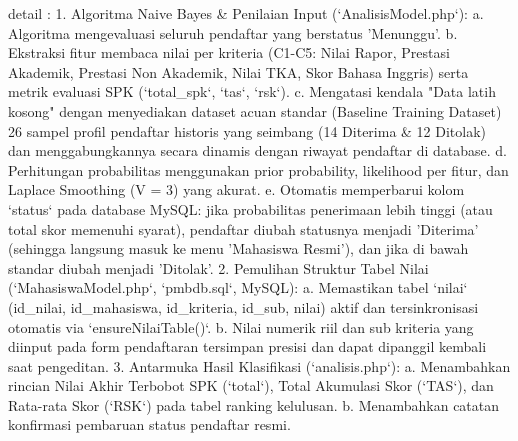         detail :
        1. Algoritma Naive Bayes & Penilaian Input (`AnalisisModel.php`):
                a. Algoritma mengevaluasi seluruh pendaftar yang berstatus 'Menunggu'.
                b. Ekstraksi fitur membaca nilai per kriteria (C1-C5: Nilai Rapor, Prestasi Akademik, Prestasi Non Akademik, Nilai TKA, Skor Bahasa Inggris) serta metrik evaluasi SPK (`total_spk`, `tas`, `rsk`).
                c. Mengatasi kendala "Data latih kosong" dengan menyediakan dataset acuan standar (Baseline Training Dataset) 26 sampel profil pendaftar historis yang seimbang (14 Diterima & 12 Ditolak) dan menggabungkannya secara dinamis dengan riwayat pendaftar di database.
                d. Perhitungan probabilitas menggunakan prior probability, likelihood per fitur, dan Laplace Smoothing (V = 3) yang akurat.
                e. Otomatis memperbarui kolom `status` pada database MySQL: jika probabilitas penerimaan lebih tinggi (atau total skor memenuhi syarat), pendaftar diubah statusnya menjadi 'Diterima' (sehingga langsung masuk ke menu 'Mahasiswa Resmi'), dan jika di bawah standar diubah menjadi 'Ditolak'.
        2. Pemulihan Struktur Tabel Nilai (`MahasiswaModel.php`, `pmbdb.sql`, MySQL):
                a. Memastikan tabel `nilai` (id_nilai, id_mahasiswa, id_kriteria, id_sub, nilai) aktif dan tersinkronisasi otomatis via `ensureNilaiTable()`.
                b. Nilai numerik riil dan sub kriteria yang diinput pada form pendaftaran tersimpan presisi dan dapat dipanggil kembali saat pengeditan.
        3. Antarmuka Hasil Klasifikasi (`analisis.php`):
                a. Menambahkan rincian Nilai Akhir Terbobot SPK (`total`), Total Akumulasi Skor (`TAS`), dan Rata-rata Skor (`RSK`) pada tabel ranking kelulusan.
                b. Menambahkan catatan konfirmasi pembaruan status pendaftar resmi.
